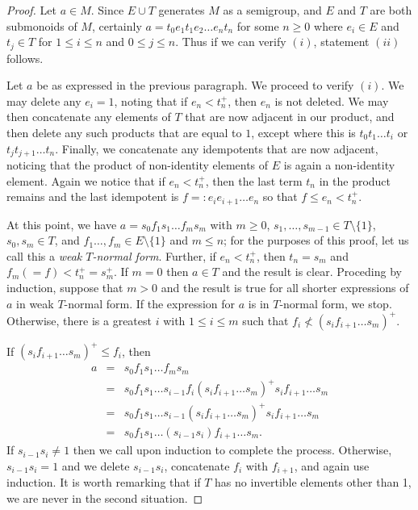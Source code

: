 \documentclass[12pt]{amsart}
\theoremstyle{definition}
\theoremstyle{definition}
\numberwithin{them}{section}
\numberwithin{equation}{section}
\begin{document}
\begin{proof}  Let $a\in M$. Since $E\cup T$ generates $M$ as a semigroup, and $E$ and $T$ are both submonoids of $M$,   certainly  $a=t_0e_1t_1e_2\dots e_nt_n$
for some  $n\geq 0$ where $e_i\in E$ and $ t_j\in T$ for $1\leq i\leq n$ and $0\leq j\leq n$.  Thus if we can verify $(i)$, statement $(ii)$ follows. 

Let $a$ be as expressed  in the previous paragraph. We proceed to verify $(i)$.  We may delete any $e_i=1$, noting that if $e_n<t_n^+$, then $e_n$ is not deleted. We  may then concatenate any elements of $T$ that are now adjacent in our product, and then delete any such products that are equal to $1$, except where this is $t_0t_1\dots t_i$ or  $t_jt_{j+1}\dots t_n$. Finally, we concatenate any idempotents that are now adjacent, noticing that the product of non-identity elements of $E$ is again a non-identity element. Again we notice that if $e_n<t_n^+$, then the last term $t_n$ in the product  remains and the last idempotent is  $f=: e_ie_{i+1}\dots e_n$ so that $f\leq e_n<t_n^+$.

At this point, we have $a=s_0f_1s_1\dots f_ms_m$ with  $m\geq 0$,
 $s_1,\dots, s_{m-1}\in T\setminus \{ 1\}$, $s_0,s_m\in T$, and $f_1\dots, f_m\in E\setminus\{ 1\}$ and  $m\leq n$;  for the purposes of this proof, let us call this a {\em weak $T$-normal form}.  Further, if $e_n<t_n^+$, then $t_n=s_m$ and $f_m(=f)<t_n^+=s_m^+$.    If $m=0$ then $a\in T$ and the result is clear. Proceding by induction, suppose  that $m>0$ and the result is true for all shorter expressions of $a$ in weak $T$-normal form.   If the  expression for $a$ is in $T$-normal form, we stop. Otherwise, there is a greatest $i$ with $1\leq i\leq m$ such that $f_i\not< (s_if_{i+1}\dots s_m)^+$. 

If $(s_if_{i+1}\dots s_m)^+\leq f_i$, then
\[\begin{array}{rcl}
a&=&s_0f_1s_1\dots f_ms_m\\
&=&s_0f_1s_1\dots s_{i-1}f_i (s_if_{i+1}\dots s_m)^+s_if_{i+1}\dots s_m\\
&=&
s_0f_1s_1\dots s_{i-1} (s_if_{i+1}\dots s_m)^+s_if_{i+1}\dots s_m\\
&=&
s_0f_1s_1\dots (s_{i-1}s_i)f_{i+1}\dots s_m.\end{array}\]
If $s_{i-1}s_i\neq 1$ then we call upon induction to complete the process. Otherwise, $s_{i-1}s_i=1 $ and we delete $s_{i-1}s_i$, concatenate $f_i$ with $f_{i+1}$,  and again use induction. It is worth remarking that if $T$ has no invertible elements other than 1,  we are never in the second situation. 


\end{proof}
\end{document}
